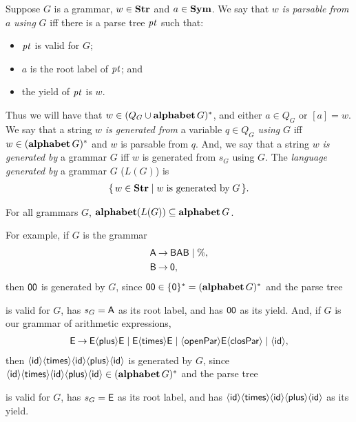 Suppose $G$ is a grammar, $w\in\mathbf{Str}$ and $a\in\mathbf{Sym}$.  We say that $w$
\emph{is parsable from} $a$ \emph{using} $G$ iff there is a parse tree
${\it pt}$ such that:
\begin{itemize}
\item ${\it pt}$ is valid for $G$;

\item $a$ is the root label of ${\it pt}$; and

\item the yield of ${\it pt}$ is $w$.
\end{itemize}
Thus we will have that $w\in(Q_G\cup\mathbf{alphabet}\,G)^*$, and either
$a\in Q_G$ or $[a] = w$.
We say that a string $w$ \emph{is generated from} a variable $q\in Q_G$
\emph{using} $G$ iff $w\in(\mathbf{alphabet}\,G)^*$ and $w$ is parsable from
$q$.
And, we say that a string $w$ \emph{is generated by} a grammar $G$ iff
$w$ is generated from $s_G$ using $G$.
The \emph{language generated by} a grammar $G$ ($L(G)$) is
\begin{gather*}
\{ \, w\in\mathbf{Str} \mid w\;\allowbreak\mbox{is generated by}\allowbreak\;G \, \}.
\end{gather*}

\begin{proposition}
For all grammars $G$, $\mathbf{alphabet}(L(G))\subseteq\mathbf{alphabet}\,G$.
\end{proposition}

For example, if $G$ is the grammar
\begin{align*}
\mathsf{A} &\mathbin{\to} \mathsf{B}\mathsf{A}\mathsf{B} \mid \% , \\
\mathsf{B} &\mathbin{\to} \mathsf{0} ,
\end{align*}
then $\mathsf{0}\mathsf{0}$ is generated by $G$,
since $\mathsf{0}\mathsf{0}\in\{\mathsf{0}\}^*=(\mathbf{alphabet}\,G)^*$ and
the parse tree
\begin{center}

\end{center}
is valid for $G$, has $s_G=\mathsf{A}$ as its root label,
and has $\mathsf{0}\mathsf{0}$ as its yield.
And, if $G$ is our grammar of arithmetic expressions,
\begin{gather*}
\mathsf{E\mathbin{\to} E{\langle\mathsf{plus}\rangle} E\mid E{\langle\mathsf{times}\rangle} E\mid {\langle\mathsf{openPar}\rangle} E{\langle\mathsf{closPar}\rangle} \mid
{\langle\mathsf{id}\rangle}} ,
\end{gather*}
then ${\langle\mathsf{id}\rangle}{\langle\mathsf{times}\rangle}{\langle\mathsf{id}\rangle}{\langle\mathsf{plus}\rangle}{\langle\mathsf{id}\rangle}$ is generated by $G$,
since ${\langle\mathsf{id}\rangle}{\langle\mathsf{times}\rangle}{\langle\mathsf{id}\rangle}{\langle\mathsf{plus}\rangle}{\langle\mathsf{id}\rangle}\in(\mathbf{alphabet}\,G)^*$ and
the parse tree
\begin{center}

\end{center}
is valid for $G$, has $s_G=\mathsf{E}$ as its root label,
and has ${\langle\mathsf{id}\rangle}{\langle\mathsf{times}\rangle}{\langle\mathsf{id}\rangle}{\langle\mathsf{plus}\rangle}{\langle\mathsf{id}\rangle}$ as its yield.

